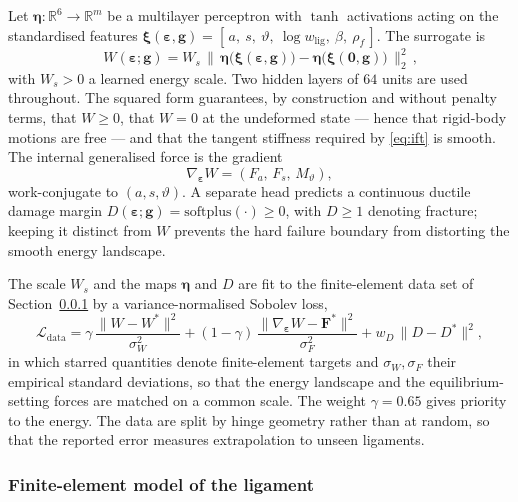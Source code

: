 \documentclass[pdflatex,sn-mathphys-num]{sn-jnl}%
\theoremstyle{thmstyleone}%
\theoremstyle{thmstyletwo}%
\theoremstyle{thmstylethree}%
\newcommand{\wlig}{w_{\mathrm{lig}}}
\newcommand{\epsh}{\bm{\varepsilon}}
\begin{document}
Let $\bm{\eta}:\mathbb{R}^{6}\to\mathbb{R}^m$ be a multilayer perceptron with
$\tanh$ activations acting on the standardised features
$\bm{\xi}(\epsh,\bm{g})=[\,a,\ s,\ \vartheta,\ \log\wlig,\ \beta,\ \rho_f\,]$.
The surrogate is
\begin{equation}
  \boxed{\,W(\epsh;\bm{g})
    = W_{s}\,\bigl\|\,\bm{\eta}\bigl(\bm{\xi}(\epsh,\bm{g})\bigr)
      -\bm{\eta}\bigl(\bm{\xi}(\bm{0},\bm{g})\bigr)\,\bigr\|_2^2\,},
  \label{eq:surrogate}
\end{equation}
with $W_s>0$ a learned energy scale. Two hidden layers of $64$ units are used
throughout. The squared form guarantees, by construction and without penalty
terms, that $W\geq 0$, that $W=0$ at the undeformed state --- hence that
rigid-body motions are free --- and that the tangent stiffness required by
\eqref{eq:ift} is smooth. The internal generalised force is the gradient
\begin{equation}
  \nabla_{\epsh}W=(F_a,\,F_s,\,M_\vartheta),
\end{equation}
work-conjugate to $(a,s,\vartheta)$. A separate head predicts a continuous ductile
damage margin $D(\epsh;\bm{g})=\mathrm{softplus}(\cdot)\ge 0$, with $D\ge1$
denoting fracture; keeping it distinct from $W$ prevents the hard failure boundary
from distorting the smooth energy landscape.

The scale $W_{s}$ and the maps $\bm{\eta}$ and $D$ are fit to the finite-element
data set of Section~\ref{sec:rve} by a variance-normalised Sobolev loss,
\begin{equation}
  \mathcal{L}_{\mathrm{data}}
  =\gamma\,\frac{\lVert W-W^\ast\rVert^2}{\sigma_W^2}
  +(1-\gamma)\,\frac{\lVert\nabla_{\epsh}W-\bm{F}^\ast\rVert^2}{\sigma_F^2}
  +w_D\,\lVert D-D^\ast\rVert^2,
  \label{eq:sobolev}
\end{equation}
in which starred quantities denote finite-element targets and $\sigma_W,\sigma_F$
their empirical standard deviations, so that the energy landscape and the
equilibrium-setting forces are matched on a common scale. The weight
$\gamma=0.65$ gives priority to the energy. The data are split by hinge geometry
rather than at random, so that the reported error measures extrapolation to unseen
ligaments.

\subsubsection{Finite-element model of the ligament}
\label{sec:rve}
\end{document}

